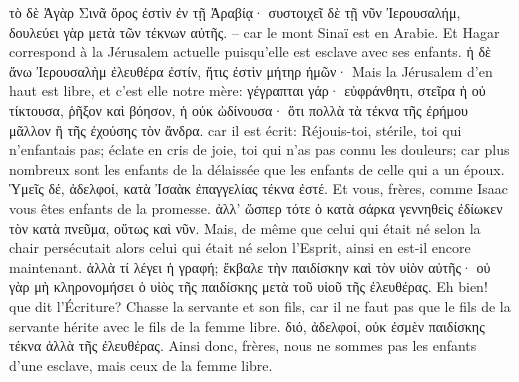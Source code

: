 \documentclass[14pt,a4paper,twoside]{extarticle}
\begin{document}
\begin{paracol}[1]
  \verset
  {τὸ δὲ Ἁγὰρ Σινᾶ ὄρος ἐστὶν ἐν τῇ Ἀραβίᾳ· συστοιχεῖ δὲ τῇ νῦν Ἰερουσαλήμ, δουλεύει γὰρ μετὰ τῶν τέκνων αὐτῆς.}
  {– car le mont Sinaï est en Arabie. Et Hagar correspond à la Jérusalem actuelle puisqu’elle est esclave avec ses enfants.}
  \verset
  {ἡ δὲ ἄνω Ἰερουσαλὴμ ἐλευθέρα ἐστίν, ἥτις ἐστὶν μήτηρ ἡμῶν·}
  {Mais la Jérusalem d’en haut est libre, et c’est elle notre mère:}
  \verset
  {γέγραπται γάρ· εὐφράνθητι, στεῖρα ἡ οὐ τίκτουσα, ῥῆξον καὶ βόησον, ἡ οὐκ ὠδίνουσα· ὅτι πολλὰ τὰ τέκνα τῆς ἐρήμου μᾶλλον ἢ τῆς ἐχούσης τὸν ἄνδρα.}
  {car il est écrit: Réjouis-toi, stérile, toi qui n’enfantais pas; éclate en cris de joie, toi qui n’as pas connu les douleurs; car plus nombreux sont les enfants de la délaissée que les enfants de celle qui a un époux.}
  \verset
  {Ὑμεῖς δέ, ἀδελφοί, κατὰ Ἰσαὰκ ἐπαγγελίας τέκνα ἐστέ.}
  {Et vous, frères, comme Isaac vous êtes enfants de la promesse.}
  \verset
  {ἀλλ’ ὥσπερ τότε ὁ κατὰ σάρκα γεννηθεὶς ἐδίωκεν τὸν κατὰ πνεῦμα, οὕτως καὶ νῦν.}
  {Mais, de même que celui qui était né selon la chair persécutait alors celui qui était né selon l’Esprit, ainsi en est-il encore maintenant.}
  \verset
  {ἀλλὰ τί λέγει ἡ γραφή; ἔκβαλε τὴν παιδίσκην καὶ τὸν υἱὸν αὐτῆς· οὐ γὰρ μὴ κληρονομήσει ὁ υἱὸς τῆς παιδίσκης μετὰ τοῦ υἱοῦ τῆς ἐλευθέρας.}
  {Eh bien! que dit l’Écriture? Chasse la servante et son fils, car il ne faut pas que le fils de la servante hérite avec le fils de la femme libre.}
  \verset
  {διό, ἀδελφοί, οὐκ ἐσμὲν παιδίσκης τέκνα ἀλλὰ τῆς ἐλευθέρας.}
  {Ainsi donc, frères, nous ne sommes pas les enfants d’une esclave, mais ceux de la femme libre.}


\end{paracol}
\end{document}
